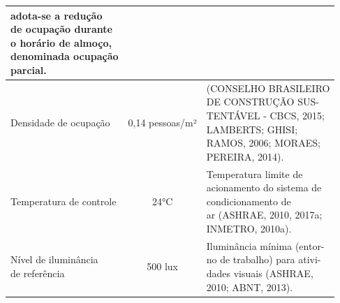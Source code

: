 \begin{table}[H]
\begin{tabular*}{\columnwidth}{@{\extracolsep{\fill}}llll}
{                                                                                                                                                                                                                                                adota-se a redução\\ de ocupação durante\\ o 
                                                                                                                                                                                                                                                horário de almoço, \\denominada ocupação\\ parcial.}  \\ \hline
        Densidade de ocupação                             & \multicolumn{2}{c}{0,14 pessoas/m²} & \makecell[l]{(CONSELHO BRASILEIRO\\ DE CONSTRUÇÃO 
                                                                                                  SUS-\\TENTÁVEL - CBCS, 2015;\\ LAMBERTS; 
                                                                                                  GHISI;\\ RAMOS, 2006; MORAES;\\ PEREIRA, 2014).} \\ \hline
        Temperatura de controle                           & \multicolumn{2}{c}{24°C}            & \makecell[l]{Temperatura limite de\\ acionamento
                                                                                                  do sistema de\\ condicionamento de\\ ar (ASHRAE, 
                                                                                                  2010, 2017a;\\ INMETRO, 2010a).} \\ \hline
        \makecell[l]{Nível de iluminância\\ de referência}& \multicolumn{2}{c}{500 lux}         & \makecell[l]{Iluminância mínima (entor-\\no de 
                                                                                                  trabalho) para ativi-\\dades visuais 
                                                                                                  (ASHRAE,\\ 2010; ABNT, 2013).} \\ \hline

\end{tabular*}
\end{table}
